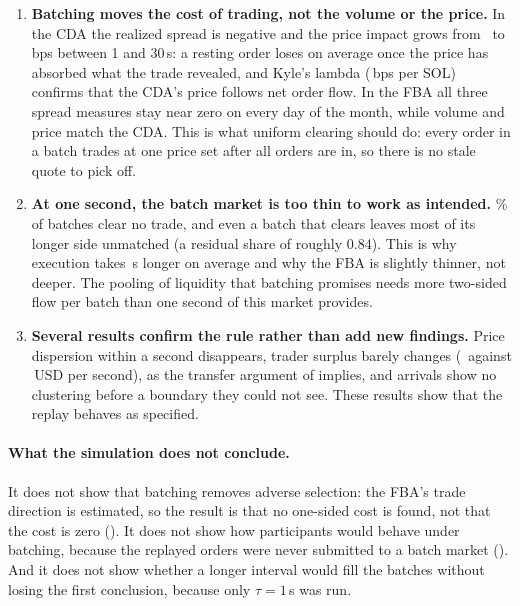 \begin{enumerate}
  \item \textbf{Batching moves the cost of trading, not the volume or the
  price.} In the CDA the realized spread is negative and the price impact
  grows from \ResPriceImpactOneSCda\ to \ResPriceImpactThirtySCda\,bps
  between 1 and 30\,s: a resting order loses on average once the price has
  absorbed what the trade revealed, and Kyle's lambda
  (\ResKyleLambdaCda\,bps per SOL) confirms that the CDA's price follows net
  order flow. In the FBA all three spread measures stay near zero on every
  day of the month, while volume and price match the CDA. This is what
  uniform clearing should do: every order in a batch trades at one price set
  after all orders are in, so there is no stale quote to pick off.
  \item \textbf{At one second, the batch market is too thin to work as
  intended.} \FbaEmptyBatchShare\% of batches clear no trade, and even a
  batch that clears leaves most of its longer side unmatched (a residual
  share of roughly 0.84). This is why execution takes \ResTimeToExecDiff\,s
  longer on average and why the FBA is slightly thinner, not deeper. The
  pooling of liquidity that batching promises needs more two-sided flow per
  batch than one second of this market provides.
  \item \textbf{Several results confirm the rule rather than add new
  findings.} Price dispersion within a second disappears, trader surplus
  barely changes (\ResTraderSurplusCda\ against \ResTraderSurplusFba\,USD
  per second), as the transfer argument of 
  implies, and arrivals show no clustering before a boundary they could not
  see. These results show that the replay behaves as specified.
\end{enumerate}

\paragraph{What the simulation does not conclude.} It does not show that
batching removes adverse selection: the FBA's trade direction is estimated,
so the result is that no one-sided cost is found, not that the cost is zero
(). It does not show how participants would behave
under batching, because the replayed orders were never submitted to a batch
market (). And it does not show whether a longer
interval would fill the batches without losing the first conclusion, because
only $\tau = 1$\,s was run.

